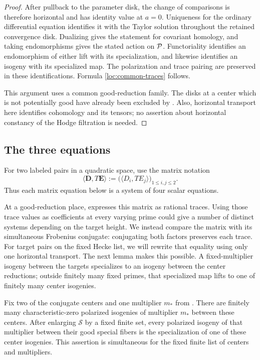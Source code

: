 \begin{proof}
After pullback to the parameter disk, the change of comparisons is
therefore horizontal and has identity value at $a=0$.  Uniqueness for
the ordinary differential equation identifies it with the Taylor
solution throughout the retained convergence disk.  Dualizing gives
the statement for covariant homology, and taking endomorphisms gives
the stated action on $\mathcal P$.  Functoriality identifies an endomorphism
of either lift with its specialization, and likewise identifies an
isogeny with its specialized map.  The polarization and trace pairing
are preserved in these identifications.  Formula
\eqref{loc:common-traces} follows.

This argument uses a common good-reduction family.  The disks at a
center which is not potentially good have already been excluded by
.  Also, horizontal transport here identifies
cohomology and its tensors; no assertion about horizontal constancy of
the Hodge filtration is needed.
\end{proof}

\subsection{The three equations}

For two labeled pairs in a quadratic space, use the matrix notation
\[
 \langle\mathbf D,T\mathbf E\rangle
 :=\bigl(\langle D_i,TE_j\rangle\bigr)_{1\leq i,j\leq2}.
\]
Thus each matrix equation below is a system of four scalar equations.

At a good-reduction place,  expresses this matrix
as rational traces. Using those trace values as coefficients at every
varying prime could give a number of distinct systems depending on the
target height. We instead compare the matrix with its simultaneous Frobenius
conjugate: conjugating both factors preserves each trace. For target
pairs on the fixed Hecke list, we will rewrite that equality using only
one horizontal transport. The next lemma makes this possible. A
fixed-multiplier isogeny between the targets specializes to an isogeny
between the center reductions; outside finitely many fixed primes, that
specialized map lifts to one of finitely many center isogenies.

\begin{lemma}
\label{loc:center-isogenies}
Fix two of the conjugate centers and one multiplier $m_*$ from
.  There are finitely many characteristic-zero
polarized isogenies of multiplier $m_*$ between these centers.
After enlarging $\mathcal S$ by a fixed finite set, every polarized
isogeny of that multiplier between their good special fibers is the
specialization of one of these center isogenies.  This assertion is
simultaneous for the fixed finite list of centers and multipliers.
\end{lemma}

